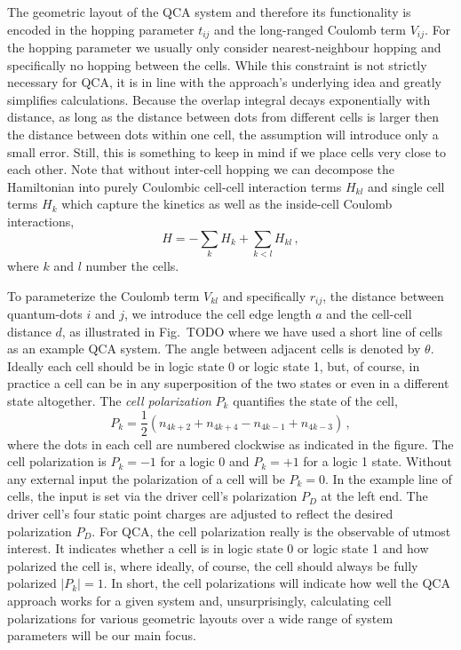The geometric layout of the QCA system and therefore its functionality is
encoded in the hopping parameter $t_{ij}$ and the long-ranged Coulomb term
$V_{ij}$. For the hopping parameter we usually only consider nearest-neighbour
hopping and specifically no hopping between the cells. While this constraint is
not strictly necessary for QCA, it is in line with the approach's underlying
idea and greatly simplifies calculations. Because the overlap integral decays
exponentially with distance, as long as the distance between dots from different
cells is larger then the distance between dots within one cell, the assumption will
introduce only a small error. Still, this is something to keep in mind if we
place cells very close to each other. Note that without inter-cell hopping we can
decompose the Hamiltonian into purely Coulombic cell-cell interaction terms
$H_{kl}$ and single cell terms $H_k$ which capture the kinetics as well as the
inside-cell Coulomb interactions,
\begin{equation}
  \label{eq:H_cell}
  H = - \sum_k H_k + \sum_{k<l} H_{kl} \, ,
\end{equation}
where $k$ and $l$ number the cells. 

To parameterize the Coulomb term $V_{kl}$ and specifically $r_{ij}$, the
distance between quantum-dots $i$ and $j$, we introduce the cell edge length $a$
and the cell-cell distance $d$, as illustrated in Fig.~TODO where we have used a
short line of cells as an example QCA system. The angle between adjacent cells
is denoted by $\theta$. Ideally each cell should be in logic state 0 or logic state 1,
but, of course, in practice a cell can be in any superposition of the two states
or even in a different state altogether. The \emph{cell polarization} $P_k$ quantifies
the state of the cell,
\begin{equation}
  \label{eq:polarization}
  P_k = \frac{1}{2} \left( n_{4k+2} + n_{4k+4} - n_{4k-1} + n_{4k-3} \right) \, ,
\end{equation}
where the dots in each cell are numbered clockwise as indicated in the figure. The
cell polarization is $P_k = -1$ for a logic 0 and $P_k = +1$ for a logic 1
state. Without any external input the polarization of a cell will be $P_k = 0$.
In the example line of cells, the input is set via the driver cell's
polarization $P_D$ at the left end. The driver cell's four static
point charges are adjusted to reflect the desired polarization $P_D$. For QCA, 
the cell polarization really is the observable of utmost interest. It indicates
whether a cell is in logic state 0 or logic state 1 and how polarized the cell
is, where ideally, of course, the cell should always be fully polarized $|P_k| =
1$. In short, the cell polarizations will indicate how well the QCA approach
works for a given system and, unsurprisingly, calculating cell polarizations for
various geometric layouts over a wide range of system parameters will be our main
focus.




